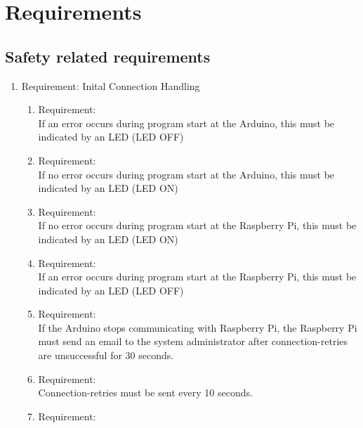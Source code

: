 \section{Requirements}
\label{chapter4}



\subsection{Safety related requirements}

	\begin{enumerate}[label*=\arabic*.]
		\item \label{req.1}  Requirement: Inital Connection Handling \\
		\begin{enumerate}[label*=\arabic*.]
			\item \label{req.1.1}  Requirement:  \\
			If an error occurs during program start at the Arduino, this must be indicated by an LED (LED OFF)\\ 
			\item \label{req.1.2} Requirement:   \\
			If no error occurs during program start at the Arduino, this must be indicated by an LED (LED ON)\\ 
			\item \label{req.1.3} Requirement:   \\
			If no error occurs during program start at the Raspberry Pi, this must be indicated by an LED (LED ON)\\    
			\item \label{req.1.4} Requirement:   \\
			If an error occurs during program start at the Raspberry Pi, this must be indicated by an LED (LED OFF)\\    
			\item \label{req.1.5} Requirement:   \\
			If the Arduino stops communicating with Raspberry Pi, the Raspberry Pi must send an email to the system administrator after connection-retries are unsuccessful for 30 seconds.\\    
   			\item \label{req.1.6} Requirement:   \\
            Connection-retries must be sent every 10 seconds.\\
			\item \label{req.1.7} Requirement:   \\

\end{enumerate}
\end{enumerate}
